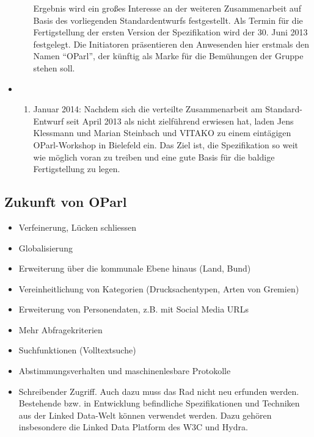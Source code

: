 \documentclass[,a4paper]{article}
\begin{document}
\begin{itemize}
\begin{enumerate}
    Ergebnis wird ein großes Interesse an der weiteren Zusammenarbeit
    auf Basis des vorliegenden Standardentwurfs festgestellt. Als Termin
    für die Fertigstellung der ersten Version der Spezifikation wird der
    30. Juni 2013 festgelegt. Die Initiatoren präsentieren den
    Anwesenden hier erstmals den Namen ``OParl'', der künftig als Marke
    für die Bemühungen der Gruppe stehen soll.
  \end{enumerate}
\item
  \begin{enumerate}
  \def\labelenumi{\arabic{enumi}.}
  \setcounter{enumi}{21}
  \itemsep1pt\parskip0pt
  \item
    Januar 2014: Nachdem sich die verteilte Zusammenarbeit am
    Standard-Entwurf seit April 2013 als nicht zielführend erwiesen hat,
    laden Jens Klessmann und Marian Steinbach und VITAKO zu einem
    eintägigen OParl-Workshop in Bielefeld ein. Das Ziel ist, die
    Spezifikation so weit wie möglich voran zu treiben und eine gute
    Basis für die baldige Fertigstellung zu legen.
  \end{enumerate}
\end{itemize}

\subsection{Zukunft von OParl}\label{zukunft-von-oparl}

\begin{itemize}
\itemsep1pt\parskip0pt
\item
  Verfeinerung, Lücken schliessen
\item
  Globalisierung
\item
  Erweiterung über die kommunale Ebene hinaus (Land, Bund)
\item
  Vereinheitlichung von Kategorien (Drucksachentypen, Arten von Gremien)
\item
  Erweiterung von Personendaten, z.B. mit Social Media URLs
\item
  Mehr Abfragekriterien
\item
  Suchfunktionen (Volltextsuche)
\item
  Abstimmungsverhalten und maschinenlesbare Protokolle
\item
  Schreibender Zugriff. Auch dazu muss das Rad nicht neu erfunden
  werden. Bestehende bzw. in Entwicklung befindliche Spezifikationen und
  Techniken aus der Linked Data-Welt können verwendet werden. Dazu
  gehören insbesondere die Linked Data Platform des W3C und Hydra.
\end{itemize}
\end{document}

